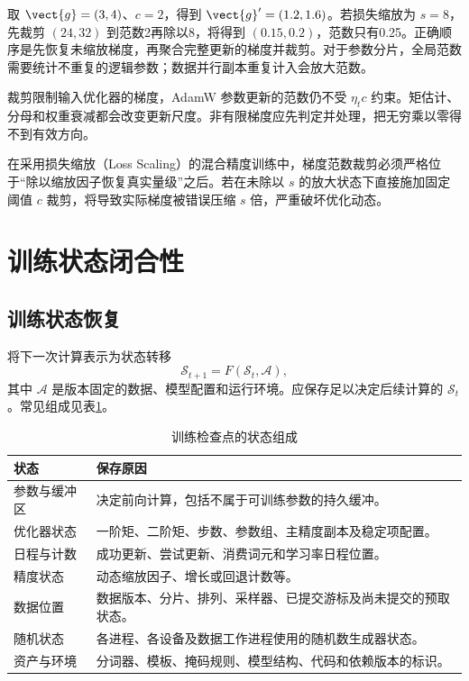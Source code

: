 \documentclass[../textbook.tex]{subfiles}
\begin{document}
取 $\vect{g}=(3,4)$、$c=2$，得到 $\vect{g}'=(1.2,1.6)$。若损失缩放为 $s=8$，先裁剪 $(24,32)$ 到范数2再除以8，将得到 $(0.15,0.2)$，范数只有0.25。正确顺序是先恢复未缩放梯度，再聚合完整更新的梯度并裁剪。对于参数分片，全局范数需要统计不重复的逻辑参数；数据并行副本重复计入会放大范数。

裁剪限制输入优化器的梯度，AdamW 参数更新的范数仍不受 $\eta_tc$ 约束。矩估计、分母和权重衰减都会改变更新尺度。非有限梯度应先判定并处理，把无穷乘以零得不到有效方向。

\begin{tip}[混合精度下的梯度未缩放与裁剪次序]
在采用损失缩放（Loss Scaling）的混合精度训练中，梯度范数裁剪必须严格位于“除以缩放因子恢复真实量级”之后。若在未除以 $s$ 的放大状态下直接施加固定阈值 $c$ 裁剪，将导致实际梯度被错误压缩 $s$ 倍，严重破坏优化动态。
\end{tip}

\section{训练状态闭合性}

\subsection{训练状态恢复}
将下一次计算表示为状态转移
\begin{equation}
 \mathcal S_{t+1}=F(\mathcal S_t,\mathcal A),
 \label{eq:stability-state-transition}
\end{equation}
其中 $\mathcal A$ 是版本固定的数据、模型配置和运行环境。应保存足以决定后续计算的 $\mathcal S_t$。常见组成见表\ref{tab:stability-checkpoint}。

\begin{table}[htbp]
\centering
\caption{训练检查点的状态组成}
\label{tab:stability-checkpoint}
\begin{tabularx}{\linewidth}{@{}p{.24\linewidth}X@{}}
\toprule
状态 & 保存原因\\
\midrule
参数与缓冲区 & 决定前向计算，包括不属于可训练参数的持久缓冲。\\
优化器状态 & 一阶矩、二阶矩、步数、参数组、主精度副本及稳定项配置。\\
日程与计数 & 成功更新、尝试更新、消费词元和学习率日程位置。\\
精度状态 & 动态缩放因子、增长或回退计数等。\\
数据位置 & 数据版本、分片、排列、采样器、已提交游标及尚未提交的预取状态。\\
随机状态 & 各进程、各设备及数据工作进程使用的随机数生成器状态。\\
资产与环境 & 分词器、模板、掩码规则、模型结构、代码和依赖版本的标识。\\
\bottomrule
\end{tabularx}
\end{table}
\end{document}
